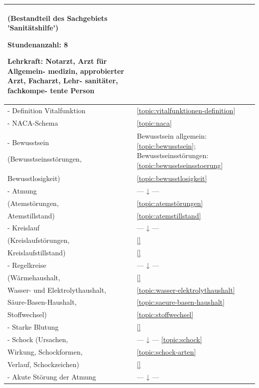 \begin{xtabular}{p{10cm}p{5cm}}
(Bestandteil des  Sachgebiets  'Sanitätshilfe') 

\begin{inparadesc}
\item[Stundenanzahl:]  8 
\item[Lehrkraft:]  Notarzt, Arzt für Allgemein- medizin, approbierter Arzt,
Facharzt,  Lehr- sanitäter,  fachkompe- tente Person
\end{inparadesc}

\\\midrule

- Definition Vitalfunktion           
& 
\noindent\ref{topic:vitalfunktionen-definition}
\\
- NACA-Schema             
& 
\ref{topic:naca}
\\
- Bewusstsein             

(Bewusstseinsstörungen, 
& 
\noindent Bewusstsein
allgemein: \ref{topic:bewusstsein};
Bewusstseinsstörungen: \ref{topic:bewusstseinsstoerung}
\\
Bewusstlosigkeit)       
& 
\noindent\ref{topic:bewusstlosigkeit}
\\
- Atmung 
& 
--- ↓ --- 
\\          
(Atemstörungen,  
& 
\noindent\ref{topic:atemstörungen}
\\
Atemstillstand)        
& 
\noindent\ref{topic:atemstillstand}
\\
- Kreislauf               
& 
--- ↓ --- 
\\
(Kreislaufstörungen,    
& 
\ref{}\noindent{}
\\
Kreislaufstillstand)    
& 
\ref{}\noindent{}
\\
- Regelkreise
& 
--- ↓ --- 
\\
(Wärmehaushalt, 
& 
\ref{}\noindent{}
\\
Wasser- und Elektrolythaushalt,
& 
\ref{topic:wasser-elektrolythaushalt}
\\
Säure-Basen-Haushalt,
& 
\ref{topic:saeure-basen-haushalt}
\\
Stoffwechsel)
& 
\ref{topic:stoffwechsel}
\\
- Starke Blutung
& 
\ref{}\noindent{}
\\
- Schock (Ursachen,
& 
--- ↓ --- \ref{topic:schock}
\\
Wirkung, Schockformen,
& 
\ref{topic:schock-arten}
\\
Verlauf, Schockzeichen)
& 
\ref{}\noindent{}
\\
- Akute Störung der Atmung 
& 
--- ↓ --- 
\\

\end{xtabular}
